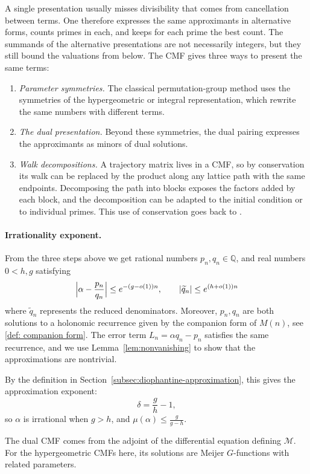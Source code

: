 A single presentation usually misses divisibility that comes from cancellation between terms. One therefore expresses the same approximants in alternative forms, counts primes in each, and keeps for each prime the best count. 
The summands of the alternative presentations are
not necessarily integers, but they still bound the valuations from below.
The CMF gives three ways to present the same terms:
\begin{enumerate}
\item \emph{Parameter symmetries.} The classical permutation-group method
\cite{Hata90,rhin1996permutation,rhinViola2001,zudilin2014zeta2} uses the symmetries of the hypergeometric or integral representation, which rewrite the same numbers with different terms.
\item \emph{The dual presentation.} Beyond these symmetries, the dual pairing expresses the approximants as minors of dual solutions.
\item \emph{Walk decompositions.} A trajectory matrix lives in a CMF, so by conservation its walk can be replaced by the product along any lattice path with the same endpoints. Decomposing the path into blocks exposes the factors added by each block, and the decomposition can be adapted to the initial condition or to individual primes. This use of conservation goes back to \cite{David2023CMF}.
\end{enumerate}

\paragraph{Irrationality exponent.}
\label{par: delta}
From the three steps above we get rational numbers $ p_n,q_n\in \mathbb Q$, and real numbers $0<h,g$ satisfying
\[
  \Bigl|\alpha-\frac{p_n}{q_n}\Bigr|\le e^{-(g-o(1))n},
  \qquad
|\widetilde{q}_n|\le e^{(h+o(1))n}
\]
where $\widetilde{q}_n$ represents the reduced denominators.
Moreover, $p_n,q_n$ are both solutions to a holonomic recurrence given by the companion form of $M(n)$, see \ref{def: companion form}. The error term $L_n=\alpha q_n-p_n$ satisfies the same recurrence, and we use Lemma~\ref{lem:nonvanishing} to show that the approximations are nontrivial. 

By the definition in Section~\ref{subsec:diophantine-approximation}, this gives the approximation exponent:
\[
  \delta=\frac gh-1,
\]
so $\alpha$ is irrational when $g>h$, and $\mu(\alpha)\le\frac{g}{g-h}$. 
\begin{remark}\label{rem:finding-dual}
The dual CMF comes from the adjoint of the differential equation defining $\mathcal M$. For the hypergeometric CMFs here, its solutions are Meijer $G$-functions with related parameters.
\end{remark}
